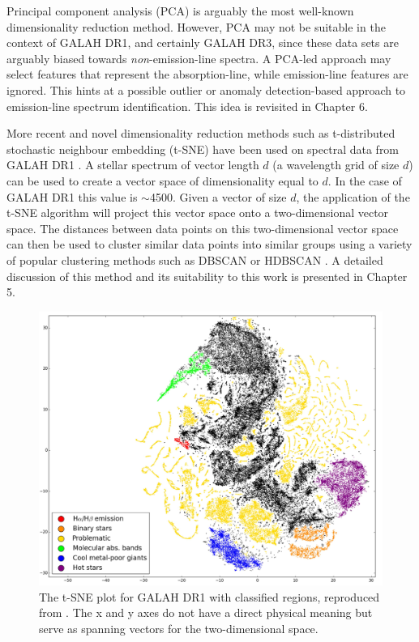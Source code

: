 Principal component analysis (PCA) is arguably the most well-known dimensionality reduction method. However, PCA may not be suitable in the context of GALAH DR1, and certainly GALAH DR3, since these data sets are arguably biased towards {\em non}-emission-line spectra. A PCA-led approach may select features that represent the absorption-line, while emission-line features are ignored. This hints at a possible outlier or anomaly detection-based approach to emission-line spectrum identification. This idea is revisited in Chapter 6.

More recent and novel dimensionality reduction methods such as t-distributed stochastic neighbour embedding (t-SNE) \citep{van2008visualizing} have been used on spectral data from GALAH DR1 \citep{traven2017galah}. A stellar spectrum of vector length $d$ (a wavelength grid of size $d$) can be used to create a vector space of dimensionality equal to $d$. In the case of GALAH DR1 this value is $\sim$4500. Given a vector of size $d$, the application of the t-SNE algorithm will project this vector space onto a two-dimensional vector space. The distances between data points on this two-dimensional vector space can then be used to cluster similar data points into similar groups using a variety of popular clustering methods such as DBSCAN \citep{ester1996density} or HDBSCAN \citep{campello2013density}. A detailed discussion of this method and its suitability to this work is presented in Chapter 5.

\begin{figure}[!htb]
\centering
\includegraphics[scale=0.36]{figures/tsne traven.png}
\caption{The t-SNE plot for GALAH DR1 with classified regions, reproduced from \citet{traven2017galah}. The x and y axes do not have a direct physical meaning but serve as spanning vectors for the two-dimensional space.}
\label{fig2.6}
\end{figure}

